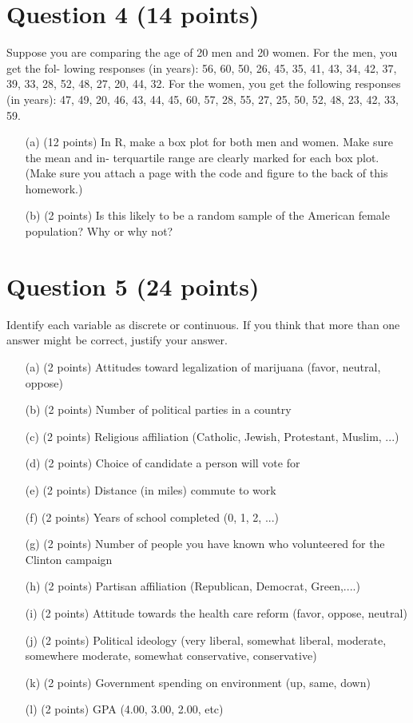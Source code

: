 \documentclass[12pt,letterpaper]{article}
\begin{document}
	\section*{Question 4 (14 points)}
	Suppose you are comparing the age of 20 men and 20 women. For the men, you get the fol- lowing responses (in years): 56, 60, 50, 26, 45, 35, 41, 43, 34, 42, 37, 39, 33, 28, 52, 48, 27, 20, 44, 32. For the women, you get the following responses (in years): 47, 49, 20, 46, 43, 44, 45, 60, 57, 28, 55, 27, 25, 50, 52, 48, 23, 42, 33, 59.
	
	\begin{itemize}
		\item[(a)] (12 points) In R, make a box plot for both men and women. Make sure the mean and in- terquartile range are clearly marked for each box plot. (Make sure you attach a page with the code and figure to the back of this homework.)
		\item[(b)] (2 points) Is this likely to be a random sample of the American female population? Why or why not?
	\end{itemize}
	
	\section*{Question 5 (24 points)}
	Identify each variable as discrete or continuous. If you think that more than one answer might be correct, justify your answer.
	
	\begin{itemize}
		\item[(a)] (2 points) Attitudes toward legalization of marijuana (favor, neutral, oppose)
		\item[(b)] (2 points) Number of political parties in a country
		\item[(c)] (2 points) Religious affiliation (Catholic, Jewish, Protestant, Muslim, ...)
		\item[(d)] (2 points) Choice of candidate a person will vote for
		\item[(e)] (2 points) Distance (in miles) commute to work
		\item[(f)] (2 points) Years of school completed (0, 1, 2, ...)
		\item[(g)] (2 points) Number of people you have known who volunteered for the Clinton campaign
		\item[(h)] (2 points) Partisan affiliation (Republican, Democrat, Green,....)
		\item[(i)] (2 points) Attitude towards the health care reform (favor, oppose, neutral)
		\item[(j)] (2 points) Political ideology (very liberal, somewhat liberal, moderate, somewhere moderate, somewhat conservative, conservative)
		\item[(k)] (2 points) Government spending on environment (up, same, down)
		\item[(l)] (2 points) GPA (4.00, 3.00, 2.00, etc)
	\end{itemize}
	
\end{document}
